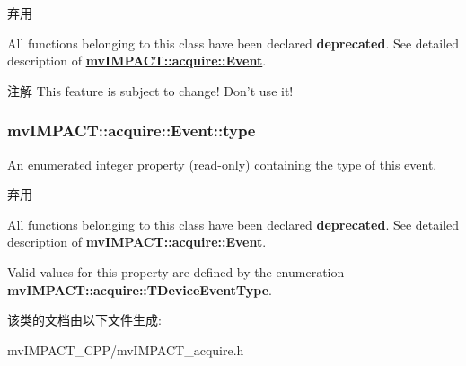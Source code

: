 \begin{DoxyRefDesc}{弃用}
\item[\hyperlink{deprecated__deprecated000022}{弃用}]All functions belonging to this class have been declared {\bfseries deprecated}. See detailed description of {\bfseries \hyperlink{classmv_i_m_p_a_c_t_1_1acquire_1_1_event}{mv\+I\+M\+P\+A\+C\+T\+::acquire\+::\+Event}}.\end{DoxyRefDesc}


\begin{DoxyNote}{注解}
This feature is subject to change! Don't use it! 
\end{DoxyNote}
\hypertarget{classmv_i_m_p_a_c_t_1_1acquire_1_1_event_a0747b4aa5d3d5f0adcfedbc635aa5def}{
\subsubsection[{type}]{ mv\+I\+M\+P\+A\+C\+T\+::acquire\+::\+Event\+::type}}\label{classmv_i_m_p_a_c_t_1_1acquire_1_1_event_a0747b4aa5d3d5f0adcfedbc635aa5def}


An enumerated integer property {\bfseries }(read-\/only) containing the type of this event. 

\begin{DoxyRefDesc}{弃用}
\item[\hyperlink{deprecated__deprecated000023}{弃用}]All functions belonging to this class have been declared {\bfseries deprecated}. See detailed description of {\bfseries \hyperlink{classmv_i_m_p_a_c_t_1_1acquire_1_1_event}{mv\+I\+M\+P\+A\+C\+T\+::acquire\+::\+Event}}.\end{DoxyRefDesc}


Valid values for this property are defined by the enumeration {\bfseries mv\+I\+M\+P\+A\+C\+T\+::acquire\+::\+T\+Device\+Event\+Type}. 

该类的文档由以下文件生成\+:\begin{DoxyCompactItemize}
\item 
mv\+I\+M\+P\+A\+C\+T\+\_\+\+C\+P\+P/mv\+I\+M\+P\+A\+C\+T\+\_\+acquire.\+h\end{DoxyCompactItemize}
